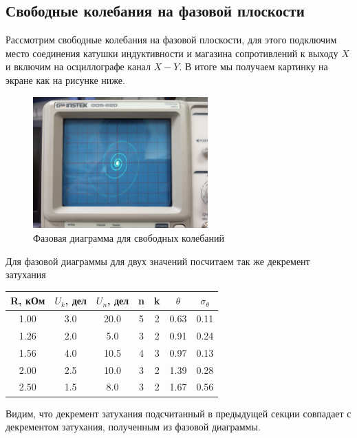 \documentclass[a4paper,12pt]{article} %
\begin{document}
\newpage
\subsection*{Свободные колебания на фазовой плоскости}
Рассмотрим свободные колебания на фазовой плоскости, для этого подключим место соединения катушки индуктивности и магазина сопротивлений к выходу $X$ и включим на осциллографе канал $X-Y$. В итоге мы получаем картинку на экране как на рисунке ниже. 
\begin{figure}[h!]
\begin{center}
\includegraphics[width = 0.6\textwidth]{2.jpg}
\caption{Фазовая диаграмма для свободных колебаний}
\end{center}
\end{figure}

Для фазовой диаграммы для двух значений посчитаем так же декремент затухания
\\
\begin{table}[h!]
\begin{center}
\begin{tabular}{|c|c|c|c|c|c|c|}
\hline
R, кОм & $U_k$, дел & $U_n$, дел & n & k & $\theta$ & $\sigma_{\theta}$    \\ \hline
1.00   & 3.0     & 20.0    & 5 & 2 & 0.63  & 0.11 \\ \hline
1.26   & 2.0     & 5.0     & 3 & 2 & 0.91  & 0.24 \\ \hline
1.56   & 4.0     & 10.5    & 4 & 3 & 0.97  & 0.13 \\ \hline
2.00   & 2.5     & 10.0    & 3 & 2 & 1.39  & 0.28 \\ \hline
2.50   & 1.5     & 8.0     & 3 & 2 & 1.67  & 0.56 \\ \hline
\end{tabular}
\end{center}
\end{table}

Видим, что декремент затухания подсчитанный в предыдущей секции совпадает с декрементом затухания, полученным из фазовой диаграммы.
\newpage
\end{document}

